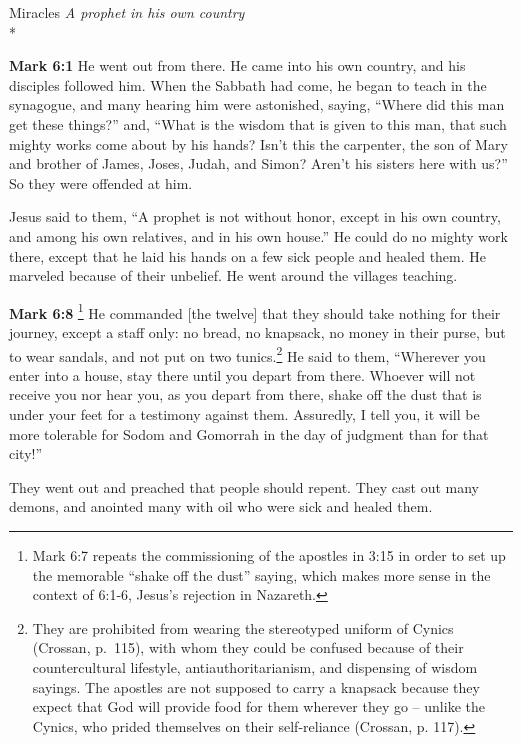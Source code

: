 \documentclass[10pt,twoside]{article} %
\newcommand{\quotesize}{\normalsize{}}
\newenvironment{quotetext}{\begingroup\quotesize}{\endgroup}
\newcommand{\intex}[1]{\index[texts]{#1}}
\newcommand{\bible}[2]{\begin{quotetext}\textbf{#1}\intex{#1} #2\end{quotetext}}
\newcommand{\gospelmark}[2]{\bible{Mark #1}{#2}}
\newcommand{\subhead}[1]{\emph{#1}\\*}
\begin{document}
\begin{section}{Miracles}
\subhead{A prophet in his own country}

\gospelmark{6:1}{
He went out from there. He came into his own country, and his disciples followed him.   When the Sabbath had come, he began to teach in the synagogue, and many hearing him were astonished, saying, ``Where did this man get these things?'' and, ``What is the wisdom that is given to this man, that such mighty works come about by his hands?   Isn't this the carpenter, the son of Mary and brother of James, Joses, Judah, and Simon? Aren't his sisters here with us?'' So they were offended at him.

  Jesus said to them, ``A prophet is not without honor, except in his own country, and among his own relatives, and in his own house.''   He could do no mighty work there, except that he laid his hands on a few sick people and healed them.   He marveled because of their unbelief.
He went around the villages teaching.   
}

\gospelmark{6:8}{\footnote{Mark 6:7 repeats the commissioning of the apostles in 3:15 in order to set up the memorable ``shake off the dust''
saying, which makes more sense in the context of 6:1-6, Jesus's rejection in Nazareth.}\index{apostles!commands for the road}
He commanded [the twelve] that they should take nothing for their journey, except a staff only: no bread, no knapsack, no money in their purse,   but to wear sandals, and not put on two tunics.\footnote{They are prohibited from wearing the stereotyped uniform of Cynics
(Crossan, p.~115), with whom they could be
confused because of their countercultural lifestyle, antiauthoritarianism, and dispensing of wisdom sayings. The apostles
are not supposed to carry a knapsack because they expect that God will provide food for them wherever they go -- unlike the
Cynics, who prided themselves on their self-reliance (Crossan, p. 117).}
He said to them, ``Wherever you enter into a house, stay there until you depart from there.    Whoever will not receive you nor hear you, as you depart from there, shake off the dust that is under your feet for a testimony against them. Assuredly, I tell you, it will be more tolerable for Sodom and Gomorrah in the day of judgment than for that city!'' 


They went out and preached that people should repent.   They cast out many demons, and anointed many with oil who were sick and healed them.
}


\end{section}
\end{document}
